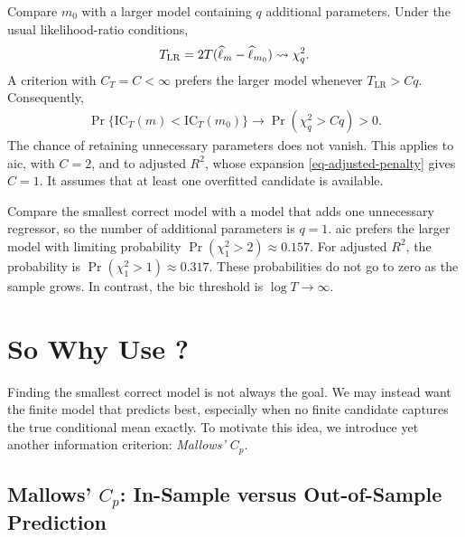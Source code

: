 \documentclass[a4paper,12pt]{article}
\begin{document}
\begin{remark}
	Compare $m_0$ with a larger model containing $q$ additional parameters.
	Under the usual likelihood-ratio conditions,
	\begin{align}
		T_{\mathrm{LR}}=2T(\widehat\ell_m-\widehat\ell_{m_0})\overset{}{\leadsto}\chi_q^2.
	\end{align}
	A criterion with $C_T=C<\infty$ prefers the larger model whenever
	$T_{\mathrm{LR}}>Cq$.
	Consequently,
	\begin{align}
		\Pr\{\mathrm{IC}_T(m)<\mathrm{IC}_T(m_0)\}
		\to\Pr(\chi_q^2>Cq)>0.
	\end{align}
	The chance of retaining unnecessary parameters does not vanish.
	This applies to \gls{aic}, with $C=2$, and to adjusted $R^2$,
	whose expansion \eqref{eq-adjusted-penalty} gives $C=1$.
	It assumes that at least one overfitted candidate is available.
\end{remark}

\begin{example}
    Compare the smallest correct model with a model that adds one unnecessary regressor,
    so the number of additional parameters is $q=1$.
    \Gls{aic} prefers the larger model with limiting probability
    $\Pr(\chi_1^2>2)\approx0.157$.
    For adjusted $R^2$, the probability is $\Pr(\chi_1^2>1)\approx0.317$.
    These probabilities do not go to zero as the sample grows.
    In contrast, the \gls{bic} threshold is $\log T\to\infty$.
\end{example}

\section{So Why Use ?}

Finding the smallest correct model is not always the goal.
We may instead want the finite model that predicts best,
especially when no finite candidate captures the true conditional mean exactly.
To motivate this idea, we introduce yet another information criterion: \emph{Mallows' $C_p$}.

\subsection{Mallows' \texorpdfstring{$C_p$}{Cp}: In-Sample versus Out-of-Sample Prediction}
\end{document}
